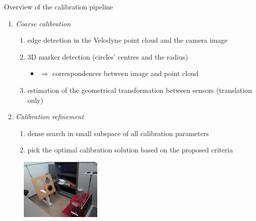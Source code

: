 \documentclass[pdf]{beamer}
\begin{document}
	\begin{frame}{Overview of the calibration pipeline}
		\begin{enumerate}
			\item \emph{Coarse calibration}
			\begin{enumerate}
				\item edge detection in the Velodyne point cloud and the camera image
				\item $3$D marker detection (circles' centres and the radius)
				\begin{itemize}
					\item $\Rightarrow$ correspondences between image and point cloud
				\end{itemize}
				\item estimation of the geometrical transformation between sensors (translation only)
			\end{enumerate}
			\item \emph{Calibration refinement}
			\begin{enumerate}
				\item dense search in small subspace of all calibration parameters
				\item pick the optimal calibration solution based on the proposed criteria
			\end{enumerate}
		\end{enumerate}
		\begin{figure}[h]
			\centering
			\includegraphics[width=0.35\textwidth]{fig/marker-side.jpg}
		\end{figure}
	\end{frame}
\end{document}
